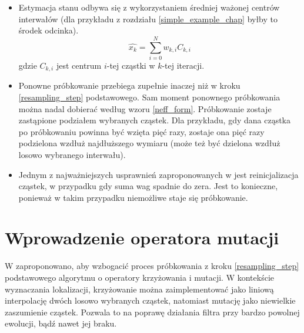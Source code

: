 \begin{itemize}
	\item Estymacja stanu odbywa się z wykorzystaniem średniej ważonej centrów interwałów (dla przykładu z rozdziału \ref{simple_example_chap} byłby to środek odcinka).
	\begin{equation}
		\hat{x_k} = \sum_{i=0}^{N} w_{k,i} C_{k,i}
	\end{equation}
	gdzie $C_{k,i}$ jest centrum $i$-tej cząstki w $k$-tej iteracji.
	\item Ponowne próbkowanie przebiega zupełnie inaczej niż w kroku \ref{resampling_step} podstawowego. Sam moment ponownego próbkowania można nadal dobierać według wzoru \ref{neff_form}. Próbkowanie zostaje zastąpione podziałem wybranych cząstek. Dla przykładu, gdy dana cząstka po próbkowaniu powinna być wzięta pięć razy, zostaje ona pięć razy podzielona wzdłuż najdłuższego wymiaru (może też być dzielona wzdłuż losowo wybranego interwału).
	\item Jednym z najważniejszych usprawnień zaproponowanych w \cite{brbpf} jest reinicjalizacja cząstek, w przypadku gdy suma wag spadnie do zera. Jest to konieczne, ponieważ w takim przypadku niemożliwe staje się próbkowanie.
\end{itemize}

\section{Wprowadzenie operatora mutacji} \label{evol_chap}
W \cite{pfgen} zaproponowano, aby wzbogacić proces próbkowania z kroku \ref{resampling_step} podstawowego algorytmu o operatory krzyżowania i mutacji. W kontekście wyznaczania lokalizacji, krzyżowanie można zaimplementować jako liniową interpolację dwóch losowo wybranych cząstek, natomiast mutację jako niewielkie zaszumienie cząstek. Pozwala to na poprawę działania filtra przy bardzo powolnej ewolucji, bądź nawet jej braku.
